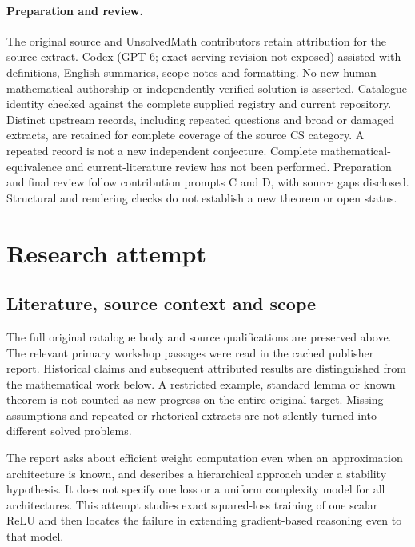 \documentclass[11pt]{article}
\begin{document}
\paragraph{Preparation and review.}
The original source and UnsolvedMath contributors retain attribution for the source extract. Codex (GPT-6; exact serving revision not exposed) assisted with definitions, English summaries, scope notes and formatting. No new human mathematical authorship or independently verified solution is asserted. Catalogue identity checked against the complete supplied registry and current repository. Distinct upstream records, including repeated questions and broad or damaged extracts, are retained for complete coverage of the source CS category. A repeated record is not a new independent conjecture. Complete mathematical-equivalence and current-literature review has not been performed. Preparation and final review follow contribution prompts C and D, with source gaps disclosed. Structural and rendering checks do not establish a new theorem or open status.
\label{end:statement}

\section{Research attempt}
\subsection{Literature, source context and scope}
The full original catalogue body and source qualifications are preserved above. The relevant primary workshop passages were read in the cached publisher report. Historical claims and subsequent attributed results are distinguished from the mathematical work below. A restricted example, standard lemma or known theorem is not counted as new progress on the entire original target. Missing assumptions and repeated or rhetorical extracts are not silently turned into different solved problems.

The report asks about efficient weight computation even when an approximation architecture is known, and describes a hierarchical approach under a stability hypothesis. It does not specify one loss or a uniform complexity model for all architectures. This attempt studies exact squared-loss training of one scalar ReLU and then locates the failure in extending gradient-based reasoning even to that model.
\end{document}
